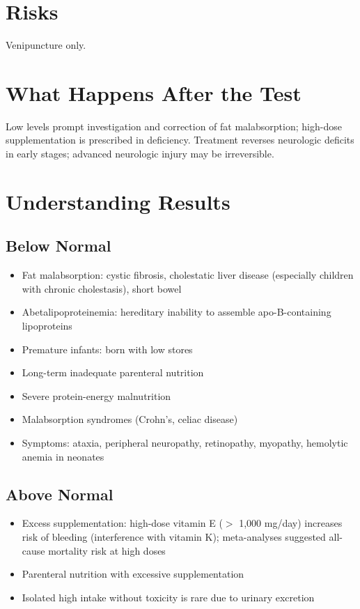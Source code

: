 \section*{Risks}
Venipuncture only.

\section*{What Happens After the Test}
Low levels prompt investigation and correction of fat malabsorption; high-dose supplementation is prescribed in deficiency. Treatment reverses neurologic deficits in early stages; advanced neurologic injury may be irreversible.

\section*{Understanding Results}

\subsection*{Below Normal}
\begin{itemize}
  \item Fat malabsorption: cystic fibrosis, cholestatic liver disease (especially children with chronic cholestasis), short bowel
  \item Abetalipoproteinemia: hereditary inability to assemble apo-B-containing lipoproteins
  \item Premature infants: born with low stores
  \item Long-term inadequate parenteral nutrition
  \item Severe protein-energy malnutrition
  \item Malabsorption syndromes (Crohn's, celiac disease)
  \item Symptoms: ataxia, peripheral neuropathy, retinopathy, myopathy, hemolytic anemia in neonates
\end{itemize}

\subsection*{Above Normal}
\begin{itemize}
  \item Excess supplementation: high-dose vitamin E ($>$ 1,000 mg/day) increases risk of bleeding (interference with vitamin K); meta-analyses suggested all-cause mortality risk at high doses
  \item Parenteral nutrition with excessive supplementation
  \item Isolated high intake without toxicity is rare due to urinary excretion
\end{itemize}

